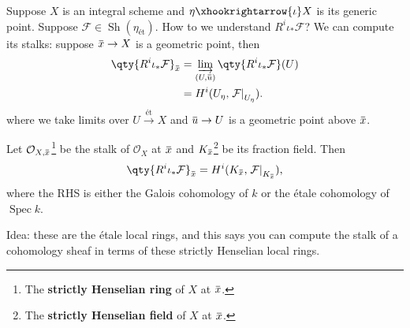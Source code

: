 \begin{example}[?]

Suppose \(X\) is an integral scheme and
\(\eta\xhookrightarrow{\iota} X\) is its generic point. Suppose
\(\mathcal{F}\in {\operatorname{Sh}}(\eta_\text{ét})\). How to we
understand \(R^i \iota_* \mathcal{F}\)? We can compute its stalks:
suppose
\(\mkern 1.5mu\overline{\mkern-1.5mux\mkern-1.5mu}\mkern 1.5mu \to X\)
is a geometric point, then
\begin{align*}  
\qty{R^i \iota_* \mathcal{F}}_{\mkern 1.5mu\overline{\mkern-1.5mux\mkern-1.5mu}\mkern 1.5mu} 
&= 
\varinjlim_{(U, \mkern 1.5mu\overline{\mkern-1.5muu\mkern-1.5mu}\mkern 1.5mu)} \qty{R^i \iota_* \mathcal{F}}(U) \\
&=
H^i(U_\eta, { \left.{{\mathcal{F}}} \right|_{{U_\eta}} })
.\end{align*}
where we take limits over \(U\xrightarrow{\text{ét}} X\) and
\(\mkern 1.5mu\overline{\mkern-1.5muu\mkern-1.5mu}\mkern 1.5mu\to U\) is
a geometric point above
\(\mkern 1.5mu\overline{\mkern-1.5mux\mkern-1.5mu}\mkern 1.5mu\).

\begin{exercise}

Let
\({\mathcal{O}}_{X, \mkern 1.5mu\overline{\mkern-1.5mux\mkern-1.5mu}\mkern 1.5mu}\)\footnote{The
  \textbf{strictly Henselian ring} of \(X\) at
  \(\mkern 1.5mu\overline{\mkern-1.5mux\mkern-1.5mu}\mkern 1.5mu\).} be
the stalk of \({\mathcal{O}}_X\) at
\(\mkern 1.5mu\overline{\mkern-1.5mux\mkern-1.5mu}\mkern 1.5mu\) and
\(K_{\mkern 1.5mu\overline{\mkern-1.5mux\mkern-1.5mu}\mkern 1.5mu}\)\footnote{The
  \textbf{strictly Henselian field} of \(X\) at
  \(\mkern 1.5mu\overline{\mkern-1.5mux\mkern-1.5mu}\mkern 1.5mu\).} be
its fraction field. Then
\begin{align*}  
\qty{R^i \iota_* \mathcal{F}}_{\mkern 1.5mu\overline{\mkern-1.5mux\mkern-1.5mu}\mkern 1.5mu}
=
H^i(K_{\mkern 1.5mu\overline{\mkern-1.5mux\mkern-1.5mu}\mkern 1.5mu}, { \left.{{\mathcal{F}}} \right|_{{K_{\mkern 1.5mu\overline{\mkern-1.5mux\mkern-1.5mu}\mkern 1.5mu}}} } )
,\end{align*}
where the RHS is either the Galois cohomology of \(k\) or the étale
cohomology of \(\operatorname{Spec}k\).

Idea: these are the étale local rings, and this says you can compute the
stalk of a cohomology sheaf in terms of these strictly Henselian local
rings.

\end{exercise}

\end{example}

